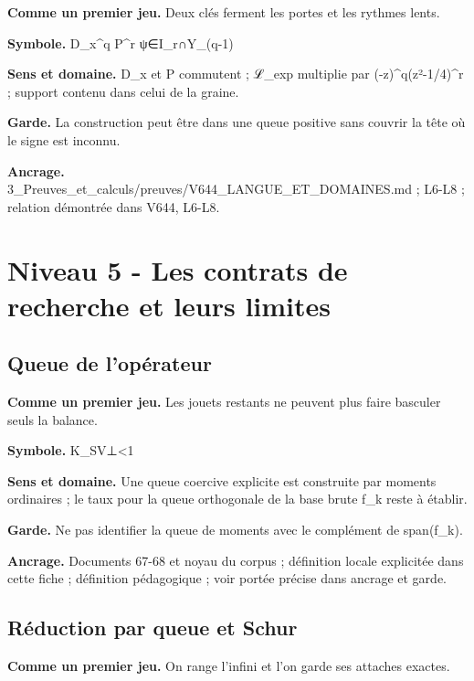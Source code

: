 \documentclass[
  9pt,
  a4paper,
]{article}
\begin{document}
\textbf{Comme un premier jeu.} Deux clés ferment les portes et les
rythmes lents.

\textbf{Symbole.} D\_x\^{}q P\^{}r ψ∈I\_r∩Y\_(q-1)

\textbf{Sens et domaine.} D\_x et P commutent ; ℒ\_exp multiplie par
(-z)\^{}q(z²-1/4)\^{}r ; support contenu dans celui de la graine.

\textbf{Garde.} La construction peut être dans une queue positive sans
couvrir la tête où le signe est inconnu.

\textbf{Ancrage.}
3\_Preuves\_et\_calculs/preuves/V644\_LANGUE\_ET\_DOMAINES.md ; L6-L8 ;
relation démontrée dans V644, L6-L8.

\hypertarget{niveau-5---les-contrats-de-recherche-et-leurs-limites}{%
\section{Niveau 5 - Les contrats de recherche et leurs
limites}\label{niveau-5---les-contrats-de-recherche-et-leurs-limites}}

\hypertarget{queue-de-lopuxe9rateur}{%
\subsection{Queue de l'opérateur}\label{queue-de-lopuxe9rateur}}

\textbf{Comme un premier jeu.} Les jouets restants ne peuvent plus faire
basculer seuls la balance.

\textbf{Symbole.}
\textbar\textbar K\_S\textbar V⊥\textbar\textbar\textless1

\textbf{Sens et domaine.} Une queue coercive explicite est construite
par moments ordinaires ; le taux pour la queue orthogonale de la base
brute f\_k reste à établir.

\textbf{Garde.} Ne pas identifier la queue de moments avec le complément
de span(f\_k).

\textbf{Ancrage.} Documents 67-68 et noyau du corpus ; définition locale
explicitée dans cette fiche ; définition pédagogique ; voir portée
précise dans ancrage et garde.

\hypertarget{ruxe9duction-par-queue-et-schur}{%
\subsection{Réduction par queue et
Schur}\label{ruxe9duction-par-queue-et-schur}}

\textbf{Comme un premier jeu.} On range l'infini et l'on garde ses
attaches exactes.
\end{document}
